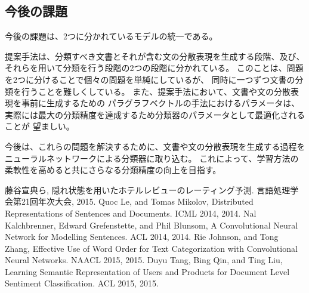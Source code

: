 \documentclass[twocolumn,a4paper]{ltjarticle}
\begin{document}
\subsection{今後の課題}

今後の課題は、2つに分かれているモデルの統一である。

提案手法は、分類すべき文書とそれが含む文の分散表現を生成する段階、及び、
それらを用いて分類を行う段階の2つの段階に分かれている。
このことは、問題を2つに分けることで個々の問題を単純にしているが、
同時に一つずつ文書の分類を行うことを難しくしている。
また、提案手法において、文書や文の分散表現を事前に生成するための
パラグラフベクトルの手法におけるパラメータは、
実際には最大の分類精度を達成するため分類器のパラメータとして最適化されることが
望ましい。

今後は、これらの問題を解決するために、文書や文の分散表現を生成する過程を
ニューラルネットワークによる分類器に取り込む。
これによって、学習方法の柔軟性を高めると共にさらなる分類精度の向上を目指す。





\begin{thebibliography}{9}
  藤谷宣典ら,
  隠れ状態を用いたホテルレビューのレーティング予測.
  言語処理学会第21回年次大会, 2015.
  Quoc Le, and Tomas Mikolov,
  Distributed Representations of Sentences and Documents.
  ICML 2014, 2014.
  Nal Kalchbrenner, Edward Grefenstette, and Phil Blunsom,
  A Convolutional Neural Network for Modelling Sentences.
  ACL 2014, 2014.
  Rie Johnson, and Tong Zhang,
  Effective Use of Word Order for Text Categorization
  with Convolutional Neural Networks.
  NAACL 2015, 2015.
  Duyu Tang, Bing Qin, and Ting Liu,
  Learning Semantic Representation of Users and Products
  for Document Level Sentiment Classification.
  ACL 2015, 2015.
\end{thebibliography}
\end{document}

